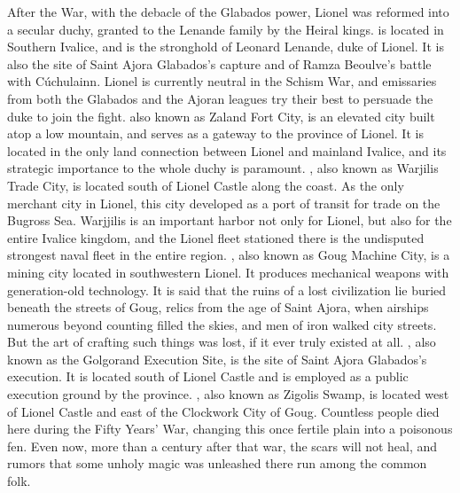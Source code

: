 After the War, with the debacle of the Glabados power, Lionel was reformed into a secular duchy, granted to the Lenande family by the Heiral kings.
 is located in Southern Ivalice, and is the stronghold of Leonard Lenande, duke of Lionel. 
It is also the site of Saint Ajora Glabados's capture and of Ramza Beoulve's battle with Cúchulainn. 
Lionel is currently neutral in the Schism War, and emissaries from both the Glabados and the Ajoran leagues try their best to persuade the duke to join the fight.
 also known as Zaland Fort City, is an elevated city built atop a low mountain, and serves as a gateway to the province of Lionel. 
It is located in the only land connection between Lionel and mainland Ivalice, and its strategic importance to the whole duchy is paramount.
, also known as Warjilis Trade City, is located south of Lionel Castle along the coast.
As the only merchant city in Lionel, this city developed as a port of transit for trade on the Bugross Sea. 
Warjjilis is an important harbor not only for Lionel, but also for the entire Ivalice kingdom, and the Lionel fleet stationed there is the undisputed strongest naval fleet in the entire region.
, also known as Goug Machine City, is a mining city located in southwestern Lionel. 
It produces mechanical weapons with generation-old technology.
It is said that the ruins of a lost civilization lie buried beneath the streets of Goug, relics from the age of Saint Ajora, when airships numerous beyond counting filled the skies, and men of iron walked city streets. 
But the art of crafting such things was lost, if it ever truly existed at all.
, also known as the Golgorand Execution Site, is the site of Saint Ajora Glabados's execution. 
It is located south of Lionel Castle and is employed as a public execution ground by the province.
, also known as Zigolis Swamp, is located west of Lionel Castle and east of the Clockwork City of Goug.
Countless people died here during the Fifty Years' War, changing this once fertile plain into a poisonous fen. 
Even now, more than a century after that war, the scars will not heal, and rumors that some unholy magic was unleashed there run among the common folk.
%
\vfill
